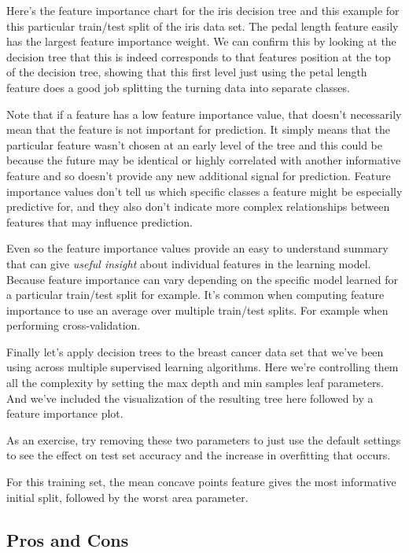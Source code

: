 \begin{multicols}{2}
Here's the feature importance chart for the iris decision tree and this example for this particular train/test split of the iris data set. The pedal length feature easily has the largest feature importance weight. We can confirm this by looking at the decision tree that this is indeed corresponds to that features position at the top of the decision tree, showing that this first level just using the petal length feature does a good job splitting the turning data into separate classes. 

Note that if a feature has a low feature importance value, that doesn't necessarily mean that the feature is not important for prediction. It simply means that the particular feature wasn't chosen at an early level of the tree and this could be because the future may be identical or highly correlated with another informative feature and so doesn't provide any new additional signal for prediction. Feature importance values don't tell us which specific classes a feature might be especially predictive for, and they also don't indicate more complex relationships between features that may influence prediction. 

Even so the feature importance values provide an easy to understand summary that can give \emph{useful insight} about individual features in the learning model. Because feature importance can vary depending on the specific model learned for a particular train/test split for example. It's common when computing feature importance to use an average over multiple train/test splits. For example when performing cross-validation. 

Finally let's apply decision trees to the breast cancer data set that we've been using across multiple supervised learning algorithms. Here we're controlling them all the complexity by setting the max depth and min samples leaf parameters. And we've included the visualization of the resulting tree here followed by a feature importance plot. 

As an exercise, try removing these two parameters to just use the default settings to see the effect on test set accuracy and the increase in overfitting that occurs. 

For this training set, the mean concave points feature gives the most informative initial split, followed by the worst area parameter. 

\subsection{Pros and Cons}


\end{multicols}
